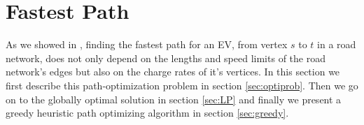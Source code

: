 \section{Fastest Path}

As we showed in , finding the fastest path for an EV, from vertex $s$ to $t$ in a road network, does not only depend on the lengths and speed limits of the road network's edges but also on the charge rates of it's vertices. In this section we first describe this path-optimization problem in section \ref{sec:optiprob}. Then we go on to the globally optimal solution in section \ref{sec:LP} and finally we present a greedy heuristic path optimizing algorithm in section \ref{sec:greedy}.
